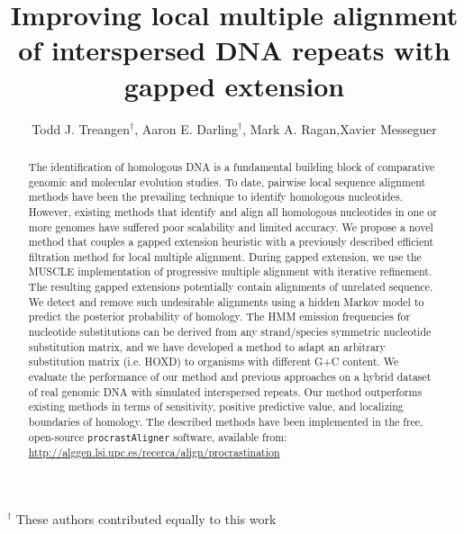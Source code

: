 \documentclass{llncs}
\begin{document}
\title{Improving local multiple alignment of interspersed DNA repeats with gapped extension}

\author{Todd J. Treangen$^\dag$, Aaron E. Darling$^\dag$, Mark A. Ragan,Xavier Messeguer}
%
%

\maketitle
{\center \scriptsize $^\dag$ These authors contributed equally to this work \\}

\begin{abstract}
The identification of homologous DNA is a fundamental building block
of comparative genomic and molecular evolution studies. To date,
pairwise local sequence alignment methods have been the prevailing
technique to identify homologous nucleotides. However, existing
methods that identify and align all homologous nucleotides in one or
more genomes have suffered poor scalability and limited accuracy. We
propose a novel method that couples a gapped extension heuristic with
a previously described efficient filtration method for local multiple
alignment.  During gapped extension, we use the MUSCLE implementation
of progressive multiple alignment with iterative refinement.  The
resulting gapped extensions potentially contain alignments of
unrelated sequence.  We detect and
remove such undesirable alignments using a hidden Markov model to
predict the posterior probability of homology. The HMM
emission frequencies for nucleotide substitutions can be derived from
any strand/species symmetric nucleotide substitution matrix, and we
have developed a method to adapt an arbitrary substitution matrix
(i.e. HOXD) to organisms with different G+C content. We evaluate the
performance of our method and previous approaches on a hybrid dataset
of real genomic DNA with simulated interspersed repeats.  Our method
outperforms existing methods in terms of sensitivity,
positive predictive value, and localizing boundaries of homology.  The
described methods have been implemented in the free, open-source
\texttt{procrastAligner} software, available from: \\
\url{http://alggen.lsi.upc.es/recerca/align/procrastination}
\end{abstract}
\end{document}
